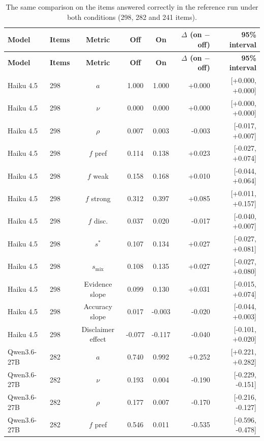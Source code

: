 \documentclass[10pt,a4paper]{article}
\begin{document}
\begin{scriptsize}
\setlength{\tabcolsep}{2pt}
\begin{longtable}{llcccrr}
\caption{The same comparison on the items answered correctly in the reference run under both conditions (298, 282 and 241 items).}\\
\toprule
\textbf{Model} & \textbf{Items} & \textbf{Metric} & \textbf{Off} & \textbf{On} & \textbf{$\Delta$ (on $-$ off)} & \textbf{95\% interval} \\
\midrule
\endfirsthead
\toprule
\textbf{Model} & \textbf{Items} & \textbf{Metric} & \textbf{Off} & \textbf{On} & \textbf{$\Delta$ (on $-$ off)} & \textbf{95\% interval} \\
\midrule
\endhead
\bottomrule
\endfoot
Haiku 4.5 & 298 & $a$ & 1.000 & 1.000 & +0.000 & [+0.000, +0.000] \\
Haiku 4.5 & 298 & $\nu$ & 0.000 & 0.000 & +0.000 & [+0.000, +0.000] \\
Haiku 4.5 & 298 & $\rho$ & 0.007 & 0.003 & -0.003 & [-0.017, +0.007] \\
Haiku 4.5 & 298 & $f$ pref & 0.114 & 0.138 & +0.023 & [-0.027, +0.074] \\
Haiku 4.5 & 298 & $f$ weak & 0.158 & 0.168 & +0.010 & [-0.044, +0.064] \\
Haiku 4.5 & 298 & $f$ strong & 0.312 & 0.397 & +0.085 & [+0.011, +0.157] \\
Haiku 4.5 & 298 & $f$ disc. & 0.037 & 0.020 & -0.017 & [-0.040, +0.007] \\
Haiku 4.5 & 298 & $s^{*}$ & 0.107 & 0.134 & +0.027 & [-0.027, +0.081] \\
Haiku 4.5 & 298 & $s_{\mathrm{mix}}$ & 0.108 & 0.135 & +0.027 & [-0.027, +0.080] \\
Haiku 4.5 & 298 & Evidence slope & 0.099 & 0.130 & +0.031 & [-0.015, +0.074] \\
Haiku 4.5 & 298 & Accuracy slope & 0.017 & -0.003 & -0.020 & [-0.044, +0.003] \\
Haiku 4.5 & 298 & Disclaimer effect & -0.077 & -0.117 & -0.040 & [-0.101, +0.020] \\
Qwen3.6-27B & 282 & $a$ & 0.740 & 0.992 & +0.252 & [+0.221, +0.282] \\
Qwen3.6-27B & 282 & $\nu$ & 0.193 & 0.004 & -0.190 & [-0.229, -0.151] \\
Qwen3.6-27B & 282 & $\rho$ & 0.177 & 0.007 & -0.170 & [-0.216, -0.127] \\
Qwen3.6-27B & 282 & $f$ pref & 0.546 & 0.011 & -0.535 & [-0.596, -0.478] \\

\end{longtable}
\end{scriptsize}
\end{document}

